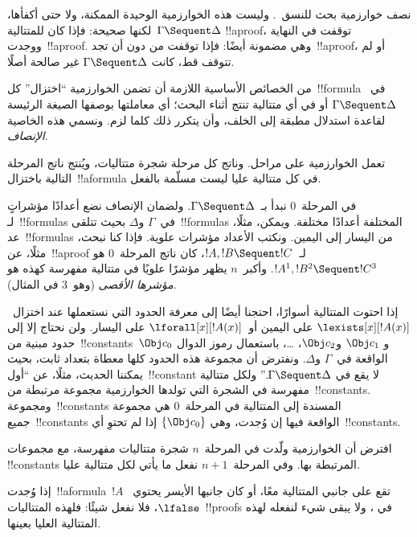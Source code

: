 \documentclass[../../../include/open-logic-section]{subfiles}
\begin{document}


نصف خوارزمية بحث للنسق~. وليست هذه الخوارزمية الوحيدة الممكنة،
ولا حتى أكفأها، لكنها صحيحة: فإذا كان للمتتالية~$\Gamma\Sequent\Delta$
!!a{proof}، توقفت في النهاية ووجدت~!!a{proof}. وهي مضمونة أيضًا: فإذا
توقفت من دون أن تجد~!!a{proof}، أو لم تتوقف قط، كانت
$\Gamma\Sequent\Delta$ غير صالحة أصلًا.

من الخصائص الأساسية اللازمة أن تضمن الخوارزمية ``اختزال'' كل~!!{formula}
في~$\Gamma\Sequent\Delta$ أو في أي متتالية تنتج أثناء البحث؛ أي معاملتها
بوصفها الصيغة الرئيسة لقاعدة استدلال مطبقة إلى الخلف، وأن يتكرر ذلك كلما
لزم. ونسمي هذه الخاصية \emph{الإنصاف}.

تعمل الخوارزمية على مراحل. وناتج كل مرحلة شجرة متتاليات، ويُنتج ناتج المرحلة
التالية باختزال~!!a{formula} في كل متتالية عليا ليست مسلّمة بالفعل.

في المرحلة~$0$ نبدأ بـ~$\Gamma\Sequent\Delta$. ولضمان الإنصاف نضع أعدادًا
مؤشراتٍ لـ~!!{formula}s في~$\Gamma$ و$\Delta$ بحيث تتلقى~!!{formula}s
المختلفة أعدادًا مختلفة. ويمكن، مثلًا، عد~!!{formula}s من اليسار إلى
اليمين. ونكتب الأعداد مؤشرات علوية. فإذا كنا نبحث، مثلًا، عن~!!a{proof}
لـ~$!A,!B\Sequent !C$، كان ناتج المرحلة~$0$ هو
$!A^1,!B^2\Sequent !C^3$. وأكبر~$n$ يظهر مؤشرًا علويًا في متتالية مفهرسة
كهذه هو \emph{مؤشرها الأقصى} (وهو~$3$ في المثال).

إذا احتوت المتتالية أسوارًا، احتجنا أيضًا إلى معرفة الحدود التي نستعملها
عند اختزال~$\lexists[x][!A(x)]$ على اليمين أو~$\lforall[x][!A(x)]$ على
اليسار. ولن نحتاج إلا إلى حدود مبنية من~!!{constant}s~$\Obj c_0$ و
$\Obj c_1$ و$\Obj c_2$، \dots، باستعمال رموز الدوال الواقعة في~$\Gamma$
و$\Delta$. ونفترض أن مجموعة هذه الحدود كلها معطاة بتعداد ثابت، بحيث يمكننا
الحديث، مثلًا، عن ``أول~!!{constant} لا يقع في
$\Gamma\Sequent\Delta$.'' ولكل متتالية مفهرسة في الشجرة التي تولدها
الخوارزمية مجموعة مرتبطة من~!!{constant}s. ومجموعة~!!{constant}s المسندة إلى المتتالية
في المرحلة~$0$ هي مجموعة جميع~!!{constant}s الواقعة فيها إن وُجدت، وهي
$\{\Obj c_0\}$ إذا لم تحتوِ أي~!!{constant}s.

افترض أن الخوارزمية ولّدت في المرحلة~$n$ شجرة متتاليات مفهرسة، مع مجموعات
!!{constant}s المرتبطة بها. وفي المرحلة~$n+1$ نفعل ما يأتي لكل متتالية
عليا.

إذا وُجدت~!!a{formula}~$!A$ تقع على جانبي المتتالية معًا، أو كان جانبها
الأيسر يحتوي~$\lfalse$، فلا نفعل شيئًا: فلهذه المتتاليات~!!{proof}s في
، ولا يبقى شيء لنفعله لهذه المتتالية العليا بعينها.
\end{document}
